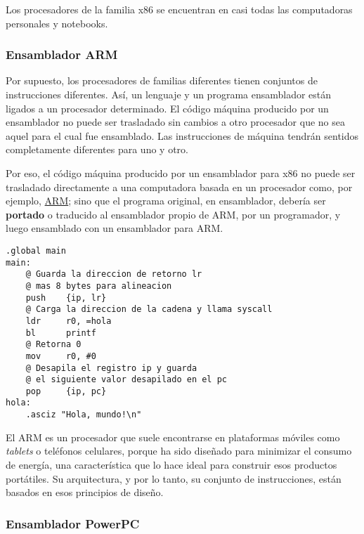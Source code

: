 \documentclass[spanish,a4paper,]{article}
\begin{document}
Los procesadores de la familia x86 se encuentran en casi todas las
computadoras personales y notebooks.

\hypertarget{ensamblador-arm}{%
\subsubsection{Ensamblador ARM}\label{ensamblador-arm}}

Por supuesto, los procesadores de familias diferentes tienen conjuntos
de instrucciones diferentes. Así, un lenguaje y un programa ensamblador
están ligados a un procesador determinado. El código máquina producido
por un ensamblador no puede ser trasladado sin cambios a otro procesador
que no sea aquel para el cual fue ensamblado. Las instrucciones de
máquina tendrán sentidos completamente diferentes para uno y otro.

Por eso, el código máquina producido por un ensamblador para x86 no
puede ser trasladado directamente a una computadora basada en un
procesador como, por ejemplo,
\href{https://es.m.wikipedia.org/wiki/Arquitectura_ARM}{ARM}; sino que
el programa original, en ensamblador, debería ser \textbf{portado} o
traducido al ensamblador propio de ARM, por un programador, y luego
ensamblado con un ensamblador para ARM.

\begin{verbatim}
.global main  
main:  
    @ Guarda la direccion de retorno lr 
    @ mas 8 bytes para alineacion
    push    {ip, lr}  
    @ Carga la direccion de la cadena y llama syscall
    ldr     r0, =hola
    bl      printf  
    @ Retorna 0
    mov     r0, #0 
    @ Desapila el registro ip y guarda
    @ el siguiente valor desapilado en el pc 
    pop     {ip, pc}  
hola:  
    .asciz "Hola, mundo!\n"  
\end{verbatim}

El ARM es un procesador que suele encontrarse en plataformas móviles
como \emph{tablets} o teléfonos celulares, porque ha sido diseñado para
minimizar el consumo de energía, una característica que lo hace ideal
para construir esos productos portátiles. Su arquitectura, y por lo
tanto, su conjunto de instrucciones, están basados en esos principios de
diseño.

\hypertarget{ensamblador-powerpc}{%
\subsubsection{Ensamblador PowerPC}\label{ensamblador-powerpc}}
\end{document}
